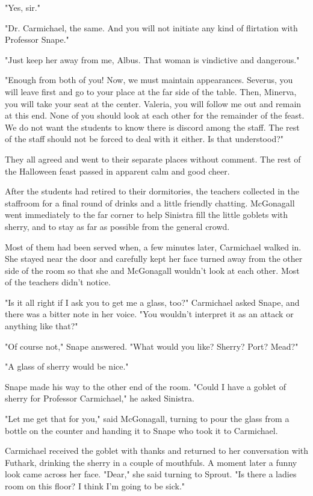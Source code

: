 \documentclass[a4paper,11pt]{article}
\begin{document}
"Yes, sir."

"Dr. Carmichael, the same. And you will not initiate any kind of flirtation with Professor Snape."

"Just keep her away from me, Albus. That woman is vindictive and dangerous."

"Enough from both of you! Now, we must maintain appearances. Severus, you will leave first and go to your place at the far side of the table. Then, Minerva, you will take your seat at the center. Valeria, you will follow me out and remain at this end. None of you should look at each other for the remainder of the feast. We do not want the students to know there is discord among the staff. The rest of the staff should not be forced to deal with it either. Is that understood?"

They all agreed and went to their separate places without comment. The rest of the Halloween feast passed in apparent calm and good cheer.

After the students had retired to their dormitories, the teachers collected in the staffroom for a final round of drinks and a little friendly chatting. McGonagall went immediately to the far corner to help Sinistra fill the little goblets with sherry, and to stay as far as possible from the general crowd.

Most of them had been served when, a few minutes later, Carmichael walked in. She stayed near the door and carefully kept her face turned away from the other side of the room so that she and McGonagall wouldn't look at each other. Most of the teachers didn't notice.

"Is it all right if I ask you to get me a glass, too?" Carmichael asked Snape, and there was a bitter note in her voice. "You wouldn't interpret it as an attack or anything like that?"

"Of course not," Snape answered. "What would you like? Sherry? Port? Mead?"

"A glass of sherry would be nice."

Snape made his way to the other end of the room. "Could I have a goblet of sherry for Professor Carmichael," he asked Sinistra.

"Let me get that for you," said McGonagall, turning to pour the glass from a bottle on the counter and handing it to Snape who took it to Carmichael.

Carmichael received the goblet with thanks and returned to her conversation with Futhark, drinking the sherry in a couple of mouthfuls. A moment later a funny look came across her face. "Dear," she said turning to Sprout. "Is there a ladies room on this floor? I think I'm going to be sick."
\end{document}
